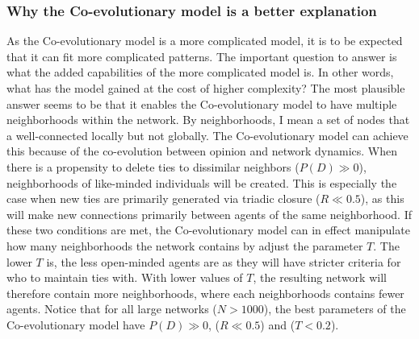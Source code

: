 \documentclass{article}
\begin{document}
\subsubsection{Why the Co-evolutionary model is a better explanation}
As the Co-evolutionary model is a more complicated model, it is to be expected that it can fit more complicated patterns. The important question to answer is what the added capabilities of the more complicated model is. In other words, what has the model gained at the cost of higher complexity?
The most plausible answer seems to be that it enables the Co-evolutionary model to have multiple neighborhoods within the network. By neighborhoods, I mean a set of nodes that a well-connected locally but not globally. The Co-evolutionary model can achieve this because of the co-evolution between opinion and network dynamics. 
When there is a propensity to delete ties to dissimilar neighbors ($P(D) \gg 0$), neighborhoods of like-minded individuals will be created. This is especially the case when new ties are primarily generated via triadic closure ($R \ll 0.5$), as this will make new connections primarily between agents of the same neighborhood. 
If these two conditions are met, the Co-evolutionary model can in effect manipulate how many neighborhoods the network contains by adjust the parameter $T$. 
The lower $T$ is, the less open-minded agents are as they will have stricter criteria for who to maintain ties with. With lower values of $T$, the resulting network will therefore contain more neighborhoods, where each neighborhoods contains fewer agents. Notice that for all large networks ($N > 1000$), the best parameters of the Co-evolutionary model have $P(D) \gg 0$, ($R \ll 0.5$) and ($T < 0.2$).
\end{document}
